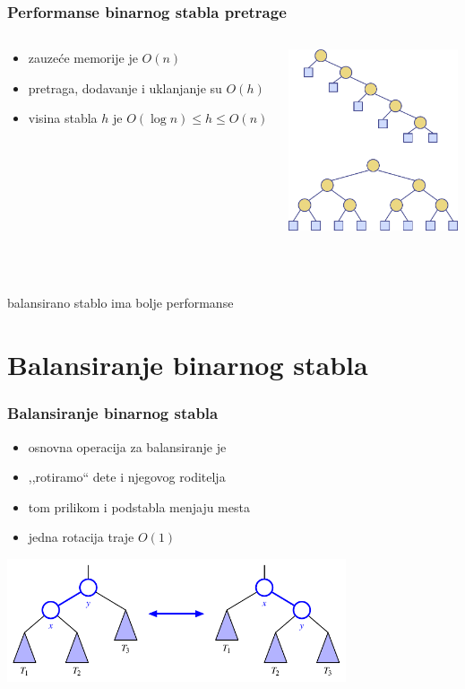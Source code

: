 \documentclass[compress]{beamer}
\begin{document}
\begin{frame}[fragile]
  \frametitle{Performanse binarnog stabla pretrage}
  \begin{columns}
    \begin{column}[c]{6cm}
      \begin{itemize}
        \item zauzeće memorije je $O(n)$
        \item pretraga, dodavanje i uklanjanje su $O(h)$
        \item visina stabla $h$ je $O(\log n) \leq h \leq O(n)$
      \end{itemize}
    \end{column}  
    \begin{column}[c]{6cm}
      \begin{center}
        \includegraphics[width=5cm]{asp-11-pic08.png}
      \end{center}
    \end{column}  
  \end{columns}
  \\ \ \\ \hfill balansirano stablo ima bolje performanse
\end{frame}

\section[Balansiranje]{Balansiranje binarnog stabla}
\begin{frame}[fragile]
  \frametitle{Balansiranje binarnog stabla}
  \begin{itemize}
    \item osnovna operacija za balansiranje je 
    \item ,,rotiramo`` dete i njegovog roditelja
    \item tom prilikom i podstabla menjaju mesta
    \item jedna rotacija traje $O(1)$
  \end{itemize}
  \begin{center}
    \includegraphics[width=10cm]{asp-11-pic09.pdf}
  \end{center}
\end{frame}
\end{document}
